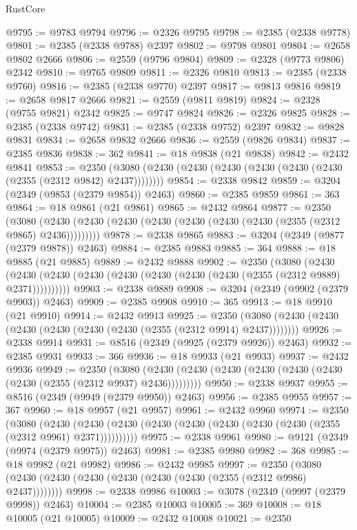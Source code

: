 \begin{lexlean}{RustCore}
\begin{coremodule}
@9795 := @9783 @9794
@9796 := @2326 @9795
@9798 := @2385 (@2338 @9778)
@9801 := @2385 (@2338 @9788) @2397
@9802 := @9798 @9801
@9804 := @2658 @9802 @2666
@9806 := @2559 (@9796 @9804)
@9809 := @2328 (@9773 @9806) @2342
@9810 := @9765 @9809
@9811 := @2326 @9810
@9813 := @2385 (@2338 @9760)
@9816 := @2385 (@2338 @9770) @2397
@9817 := @9813 @9816
@9819 := @2658 @9817 @2666
@9821 := @2559 (@9811 @9819)
@9824 := @2328 (@9755 @9821) @2342
@9825 := @9747 @9824
@9826 := @2326 @9825
@9828 := @2385 (@2338 @9742)
@9831 := @2385 (@2338 @9752) @2397
@9832 := @9828 @9831
@9834 := @2658 @9832 @2666
@9836 := @2559 (@9826 @9834)
@9837 := @2385 @9836
@9838 := 362
@9841 := @18 @9838 (@21 @9838)
@9842 := @2432 @9841
@9853 := @2350 (@3080 (@2430 (@2430 (@2430 (@2430 (@2430 (@2430 (@2355 (@2312 @9842) @2437))))))))
@9854 := @2338 @9842
@9859 := @3204 (@2349 (@9853 (@2379 @9854)) @2463)
@9860 := @2385 @9859
@9861 := 363
@9864 := @18 @9861 (@21 @9861)
@9865 := @2432 @9864
@9877 := @2350
    (@3080 (@2430 (@2430 (@2430 (@2430 (@2430 (@2430 (@2430 (@2355 (@2312 @9865) @2436)))))))))
@9878 := @2338 @9865
@9883 := @3204 (@2349 (@9877 (@2379 @9878)) @2463)
@9884 := @2385 @9883
@9885 := 364
@9888 := @18 @9885 (@21 @9885)
@9889 := @2432 @9888
@9902 := @2350
    (@3080
      (@2430 (@2430 (@2430 (@2430 (@2430 (@2430 (@2430 (@2430 (@2355 (@2312 @9889) @2371))))))))))
@9903 := @2338 @9889
@9908 := @3204 (@2349 (@9902 (@2379 @9903)) @2463)
@9909 := @2385 @9908
@9910 := 365
@9913 := @18 @9910 (@21 @9910)
@9914 := @2432 @9913
@9925 := @2350 (@3080 (@2430 (@2430 (@2430 (@2430 (@2430 (@2430 (@2355 (@2312 @9914) @2437))))))))
@9926 := @2338 @9914
@9931 := @8516 (@2349 (@9925 (@2379 @9926)) @2463)
@9932 := @2385 @9931
@9933 := 366
@9936 := @18 @9933 (@21 @9933)
@9937 := @2432 @9936
@9949 := @2350
    (@3080 (@2430 (@2430 (@2430 (@2430 (@2430 (@2430 (@2430 (@2355 (@2312 @9937) @2436)))))))))
@9950 := @2338 @9937
@9955 := @8516 (@2349 (@9949 (@2379 @9950)) @2463)
@9956 := @2385 @9955
@9957 := 367
@9960 := @18 @9957 (@21 @9957)
@9961 := @2432 @9960
@9974 := @2350
    (@3080
      (@2430 (@2430 (@2430 (@2430 (@2430 (@2430 (@2430 (@2430 (@2355 (@2312 @9961) @2371))))))))))
@9975 := @2338 @9961
@9980 := @9121 (@2349 (@9974 (@2379 @9975)) @2463)
@9981 := @2385 @9980
@9982 := 368
@9985 := @18 @9982 (@21 @9982)
@9986 := @2432 @9985
@9997 := @2350 (@3080 (@2430 (@2430 (@2430 (@2430 (@2430 (@2430 (@2355 (@2312 @9986) @2437))))))))
@9998 := @2338 @9986
@10003 := @3078 (@2349 (@9997 (@2379 @9998)) @2463)
@10004 := @2385 @10003
@10005 := 369
@10008 := @18 @10005 (@21 @10005)
@10009 := @2432 @10008
@10021 := @2350

\end{coremodule}
\end{lexlean}
